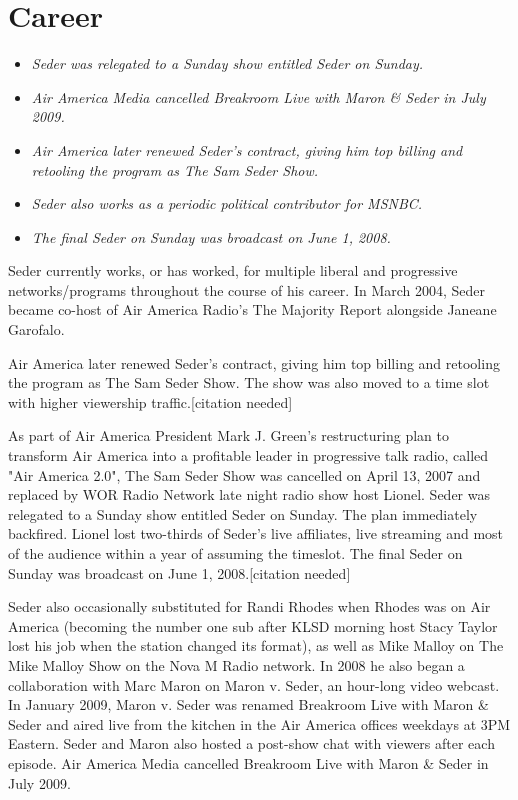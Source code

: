 \section{Career}\label{career}

\begin{itemize}
\item
  \emph{Seder was relegated to a Sunday show entitled Seder on Sunday.}
\item
  \emph{Air America Media cancelled Breakroom Live with Maron \& Seder
  in July 2009.}
\item
  \emph{Air America later renewed Seder's contract, giving him top
  billing and retooling the program as The Sam Seder Show.}
\item
  \emph{Seder also works as a periodic political contributor for MSNBC.}
\item
  \emph{The final Seder on Sunday was broadcast on June 1, 2008.}
\end{itemize}

Seder currently works, or has worked, for multiple liberal and
progressive networks/programs throughout the course of his career. In
March 2004, Seder became co-host of Air America Radio's The Majority
Report alongside Janeane Garofalo.

Air America later renewed Seder's contract, giving him top billing and
retooling the program as The Sam Seder Show. The show was also moved to
a time slot with higher viewership traffic.{[}citation needed{]}

As part of Air America President Mark J. Green's restructuring plan to
transform Air America into a profitable leader in progressive talk
radio, called "Air America 2.0", The Sam Seder Show was cancelled on
April 13, 2007 and replaced by WOR Radio Network late night radio show
host Lionel. Seder was relegated to a Sunday show entitled Seder on
Sunday. The plan immediately backfired. Lionel lost two-thirds of
Seder's live affiliates, live streaming and most of the audience within
a year of assuming the timeslot. The final Seder on Sunday was broadcast
on June 1, 2008.{[}citation needed{]}

Seder also occasionally substituted for Randi Rhodes when Rhodes was on
Air America (becoming the number one sub after KLSD morning host Stacy
Taylor lost his job when the station changed its format), as well as
Mike Malloy on The Mike Malloy Show on the Nova M Radio network. In 2008
he also began a collaboration with Marc Maron on Maron v. Seder, an
hour-long video webcast. In January 2009, Maron v. Seder was renamed
Breakroom Live with Maron \& Seder and aired live from the kitchen in
the Air America offices weekdays at 3PM Eastern. Seder and Maron also
hosted a post-show chat with viewers after each episode. Air America
Media cancelled Breakroom Live with Maron \& Seder in July 2009.

